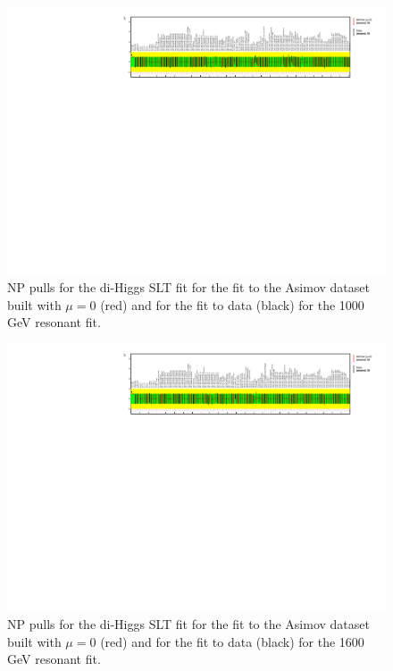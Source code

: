 \begin{figure}
\centering
\includegraphics[angle=270]{figures/results/HH/LepHad/NP_allExceptGammas_2HDM1000_SLT.pdf}
\caption{NP pulls for the di-Higgs \lephad SLT fit for the fit to the Asimov dataset built with $\mu=0$ (red) and for the fit to data (black) for the 1000 GeV resonant fit.}
\label{fig:LepHadPostfitNPPulls2HDM1000SLT}
\end{figure}

\begin{figure}
\centering
\includegraphics[angle=270]{figures/results/HH/LepHad/NP_allExceptGammas_2HDM1600_SLT.pdf}
\caption{NP pulls for the di-Higgs \lephad SLT fit for the fit to the Asimov dataset built with $\mu=0$ (red) and for the fit to data (black) for the 1600 GeV resonant fit.}
\label{fig:LepHadPostfitNPPulls2HDM1600SLT}
\end{figure}

